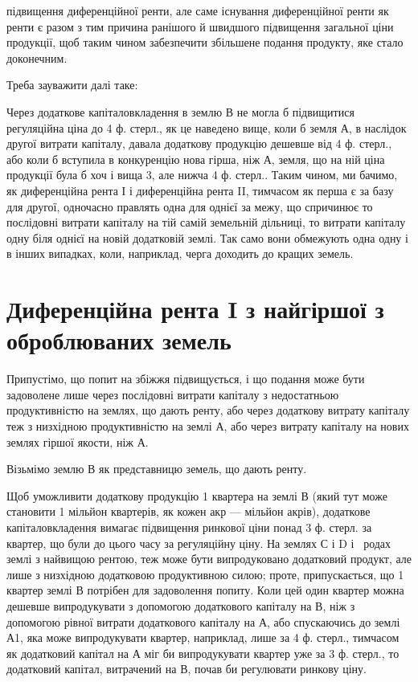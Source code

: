 \parcont{}  %
підвищення диференційної ренти, але саме існування диференційної ренти як
ренти є разом з тим причина ранішого й швидшого підвищення загальної ціни
продукції, щоб таким чином забезпечити збільшене подання продукту, яке стало доконечним.

Треба зауважити далі таке:

Через додаткове капіталовкладення в землю В не могла б підвищитися
регуляційна ціна до 4 ф. стерл., як це наведено вище, коли б земля А, в наслідок
другої витрати капіталу, давала додаткову продукцію дешевше від 4 ф.
стерл., або коли б вступила в конкуренцію нова гірша, ніж А, земля, що на
ній ціна продукції була б хоч і вища 3, але нижча 4 ф. стерл.. Таким чином,
ми бачимо, як диференційна рента І і диференційна рента II, тимчасом як
перша є за базу для другої, одночасно правлять одна для однієї за межу, що
спричинює то послідовні витрати капіталу на тій самій земельній дільниці, то
витрати капіталу одну біля однієї на новій додатковій землі. Так само вони
обмежують одна одну і в інших випадках, коли, наприклад, черга доходить до
кращих земель.

\section{Диференційна рента I з найгіршої з оброблюваних земель}

Припустімо, що попит на збіжжя підвищується, і що подання може бути
задоволене лише через послідовні витрати капіталу з недостатньою продуктивністю
на землях, що дають ренту, або через додаткову витрату капіталу
теж з низхідною продуктивністю на землі А, або через витрату капіталу на
нових землях гіршої якости, ніж А.

Візьмімо землю В як представницю земель, що дають ренту.

Щоб уможливити додаткову продукцію 1 квартера на землі В (який
тут може становити 1 мільйон квартерів, як кожен акр — мільйон акрів), додаткове
капіталовкладення вимагає підвищення ринкової ціни понад 3 ф. стерл.
за квартер, що були до цього часу за регуляційну ціну. На землях С і D і~ родах землі з найвищою рентою, теж може бути випродуковано додатковий
продукт, але лише з низхідною додатковою продуктивною силою; проте,
припускається, що 1 квартер землі В потрібен для задоволення попиту.
Коли цей один квартер можна дешевше випродукувати з допомогою додаткового
капіталу на В, ніж з допомогою рівної витрати додаткового капіталу
на А, або спускаючись до землі А1, яка може випродукувати квартер, наприклад,
лише за 4 ф. стерл., тимчасом як додатковий капітал на А міг би випродукувати
квартер уже за 3 ф. стерл., то додатковий капітал, витрачений на
В, почав би регулювати ринкову ціну.

